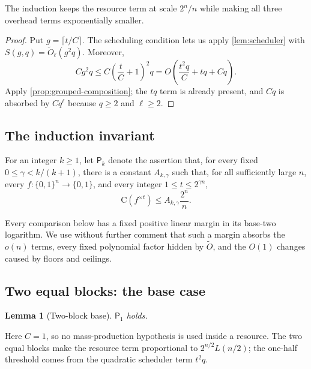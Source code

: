 \documentclass[11pt]{article}
\newtheorem{lemma}[lemma]{Lemma}
\newcommand{\bits}{\{0,1\}}
\newcommand{\C}{\mathrm{C}}
\begin{document}
The induction keeps the resource term at scale $2^n/n$ while making all
three overhead terms exponentially smaller.

\begin{proof}
Put $g=\lceil t/C\rceil$.  The scheduling condition lets us apply
\cref{lem:scheduler} with
$S(g,q)=\widetilde O_\ell(g^2q)$.  Moreover,
\[
  Cg^2q
  \le C\left(\frac{t}{C}+1\right)^2q
  =O\!\left(\frac{t^2q}{C}+tq+Cq\right).
\]
Apply \cref{prop:grouped-composition}; the $tq$ term is already present, and
$Cq$ is absorbed by $Cq^\ell$ because $q\ge2$ and $\ell\ge2$.
\end{proof}

\subsection{The induction invariant}

For an integer $k\ge1$, let $\mathsf P_k$ denote the assertion that, for every
fixed $0\le\gamma<k/(k+1)$, there is a constant $A_{k,\gamma}$ such that, for
all sufficiently large $n$, every $f:\bits^n\to\bits$, and every integer
$1\le t\le2^{\gamma n}$,
\[
  \C(f^{\times t})\le A_{k,\gamma}\frac{2^n}{n}.
\]

Every comparison below has a fixed positive linear margin in its base-two
logarithm.  We use without further comment that such a margin absorbs the
$o(n)$ terms, every fixed polynomial factor hidden by $\widetilde O$, and the
$O(1)$ changes caused by floors and ceilings.

\subsection{Two equal blocks: the base case}

\begin{lemma}[Two-block base]\label{lem:base}
$\mathsf P_1$ holds.
\end{lemma}

Here $C=1$, so no mass-production hypothesis is used inside a resource.  The
two equal blocks make the resource term proportional to $2^{n/2}L(n/2)$; the
one-half threshold comes from the quadratic scheduler term $t^2q$.
\end{document}
